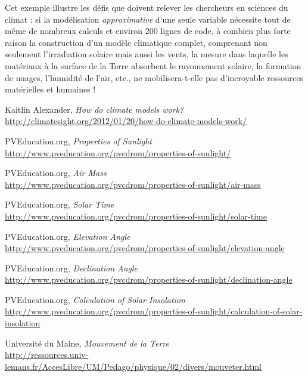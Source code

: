 \documentclass[12pt]{article}
\begin{document}
Cet exemple illustre les défis que doivent relever les chercheurs en sciences du climat : si la modélisation \emph{approximative} d'une seule variable nécessite tout de même de nombreux calculs et environ 200 lignes de code, à combien plus forte raison la construction d'un modèle climatique complet, comprenant non seulement l'irradiation solaire mais aussi les vents, la mesure dans laquelle les matériaux à la surface de la Terre absorbent le rayonnement solaire, la formation de nuages, l'humidité de l'air, etc., ne mobilisera-t-elle pas d'incroyable ressources matérielles et humaines !


\clearpage
\begin{thebibliography}{99}

	Kaitlin Alexander,
	\emph{How do climate models work?}\\
	\url{http://climatesight.org/2012/01/20/how-do-climate-models-work/}

	PVEducation.org,
	\emph{Properties of Sunlight}\\
	\url{http://www.pveducation.org/pvcdrom/properties-of-sunlight/}

	PVEducation.org,
	\emph{Air Mass}\\
	\url{http://www.pveducation.org/pvcdrom/properties-of-sunlight/air-mass}

	PVEducation.org,
	\emph{Solar Time}\\
	\url{http://www.pveducation.org/pvcdrom/properties-of-sunlight/solar-time}

	PVEducation.org,
	\emph{Elevation Angle}\\
	\url{http://www.pveducation.org/pvcdrom/properties-of-sunlight/elevation-angle}

	PVEducation.org,
	\emph{Declination Angle}\\
	\url{http://www.pveducation.org/pvcdrom/properties-of-sunlight/declination-angle}

	PVEducation.org,
	\emph{Calculation of Solar Insolation}\\
	\url{http://www.pveducation.org/pvcdrom/properties-of-sunlight/calculation-of-solar-insolation}

	Université du Maine,
	\emph{Mouvement de la Terre}\\
	\url{http://ressources.univ-lemans.fr/AccesLibre/UM/Pedago/physique/02/divers/mouveter.html}


\end{thebibliography}
\end{document}
